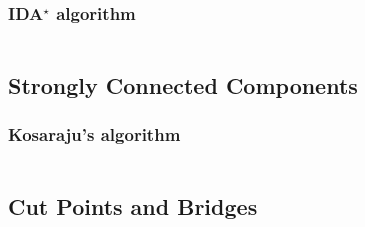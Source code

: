 \documentclass[9pt,a4paper,twocolumn,landscape,oneside]{amsart}
\newcommand{\code}[1]{\inputminted{cpp}{_code/#1}}
\newif\ifverbose
\begin{document}
        \subsubsection{IDA$^\star$ algorithm}
            \code{graph/idastar.cpp}

    \ifverbose
    \subsection{All-Pairs Shortest Paths}
        \subsubsection{Floyd-Warshall algorithm}
            The Floyd-Warshall algorithm solves the all-pairs shortest paths
            problem in $O(|V|^3)$ time.
            \code{graph/floyd_warshall.cpp}
    \fi

    \subsection{Strongly Connected Components}
        \subsubsection{Kosaraju's algorithm}
            \ifverbose
            Kosarajus's algorithm finds strongly connected components of a
            directed graph in $O(|V|+|E|)$ time.
            \fi
            \code{graph/scc.cpp}

    \subsection{Cut Points and Bridges}
        \code{graph/cut_points_and_bridges.cpp}

    \ifverbose
    \subsection{Minimum Spanning Tree}
        \subsubsection{Kruskal's algorithm}
            \code{graph/kruskals_mst.cpp}
    \fi

    \ifverbose
    \subsection{Topological Sort}
        \subsubsection{Modified Depth-First Search}
            \code{graph/tsort.cpp}
    \fi
\end{document}
